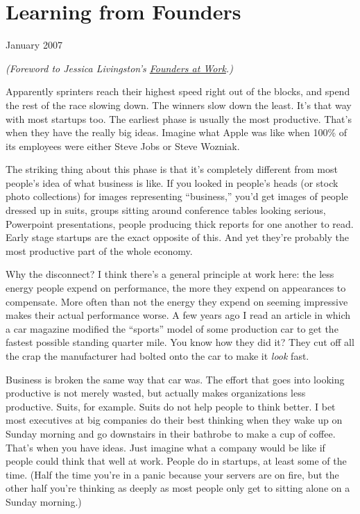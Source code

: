 \chapter{Learning from Founders}

January 2007

\emph{(Foreword to Jessica Livingston's
\href{http://www.amazon.com/gp/product/1590597141}{Founders at Work}.)}

Apparently sprinters reach their highest speed right out of the blocks,
and spend the rest of the race slowing down. The winners slow down the
least. It's that way with most startups too. The earliest phase is
usually the most productive. That's when they have the really big ideas.
Imagine what Apple was like when 100\% of its employees were either
Steve Jobs or Steve Wozniak.

The striking thing about this phase is that it's completely different
from most people's idea of what business is like. If you looked in
people's heads (or stock photo collections) for images representing
``business,'' you'd get images of people dressed up in suits, groups
sitting around conference tables looking serious, Powerpoint
presentations, people producing thick reports for one another to read.
Early stage startups are the exact opposite of this. And yet they're
probably the most productive part of the whole economy.

Why the disconnect? I think there's a general principle at work here:
the less energy people expend on performance, the more they expend on
appearances to compensate. More often than not the energy they expend on
seeming impressive makes their actual performance worse. A few years ago
I read an article in which a car magazine modified the ``sports'' model
of some production car to get the fastest possible standing quarter
mile. You know how they did it? They cut off all the crap the
manufacturer had bolted onto the car to make it \emph{look} fast.

Business is broken the same way that car was. The effort that goes into
looking productive is not merely wasted, but actually makes
organizations less productive. Suits, for example. Suits do not help
people to think better. I bet most executives at big companies do their
best thinking when they wake up on Sunday morning and go downstairs in
their bathrobe to make a cup of coffee. That's when you have ideas. Just
imagine what a company would be like if people could think that well at
work. People do in startups, at least some of the time. (Half the time
you're in a panic because your servers are on fire, but the other half
you're thinking as deeply as most people only get to sitting alone on a
Sunday morning.)

